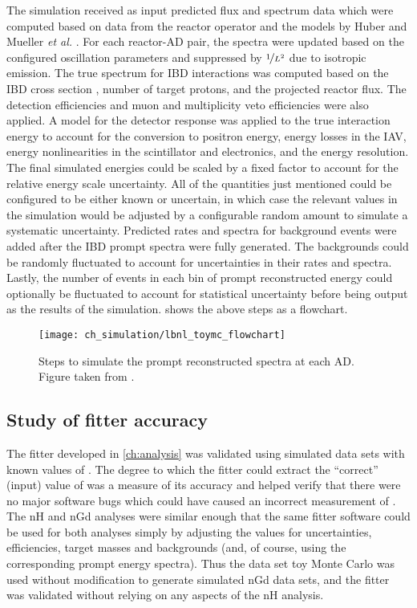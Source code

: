 The simulation received as input predicted \nuebar{} flux and spectrum data
which were computed \cite{christine_reactor} based on data from the reactor operator
and the models by Huber \cite{reactor_huber}
and Mueller \emph{et al.} \cite{reactor_mueller}.
For each reactor-AD pair, the spectra were updated
based on the configured oscillation parameters
and suppressed by $\nicefrac{1}{L^2}$ due to isotropic emission.
The true \nuebar{} spectrum for IBD interactions was computed
based on the IBD cross section \cite{ibd_xsec,ibd_xsec_note},
number of target protons, and the projected reactor flux.
The detection efficiencies and muon and multiplicity veto efficiencies
were also applied.
A model for the detector response was applied to the true interaction energy
to account for the conversion to positron energy,
energy losses in the IAV,
energy nonlinearities in the scintillator and electronics,
and the energy resolution.
The final simulated energies could be scaled by a fixed factor
to account for the relative energy scale uncertainty.
All of the quantities just mentioned could be configured
to be either known or uncertain, in which case
the relevant values in the simulation would be
adjusted by a configurable random amount
to simulate a systematic uncertainty.
Predicted rates and spectra for background events
were added after the IBD prompt spectra were fully generated.
The backgrounds could be randomly fluctuated to account for
uncertainties in their rates and spectra.
Lastly, the number of events in each bin of prompt reconstructed energy
could optionally be fluctuated to account for statistical uncertainty
before being output as the results of the simulation.
 shows the above steps as a flowchart.

\begin{figure}
    \centering
    \texttt{[image: ch\_simulation/lbnl\_toymc\_flowchart]}
    \caption[Flowchart of data set toy Monte Carlo]{
        Steps to simulate the prompt reconstructed spectra
        at each AD.
        Figure taken from \cite{lbnl_toymc}.
    }
    \label{fig:lbnl_toymc_flowchart}
\end{figure}

\subsection{Study of fitter accuracy}
\label{subsec:fitter_validation}

The fitter developed in \cref{ch:analysis} was validated
using simulated data sets with known values of \thetaot{}.
The degree to which the fitter could extract
the ``correct'' (input) value of \thetaot{}
was a measure of its accuracy
and helped verify that there were no major software bugs
which could have caused an incorrect measurement of \thetaot{}.
The nH and nGd analyses were similar enough
that the same fitter software could be used for both analyses
simply by adjusting the values for uncertainties, efficiencies,
target masses and backgrounds
(and, of course, using the corresponding prompt energy spectra).
Thus the data set toy Monte Carlo was used without modification
to generate simulated nGd data sets,
and the fitter was validated without relying on
any aspects of the nH analysis.

